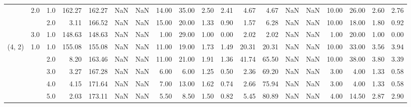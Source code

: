 \begin{tabular}{lllrrrrrrrrrrrrrrrr}
       & 2.0 & 1.0  &    162.27 &     162.27 &               NaN &                NaN & 14.00 &  35.00 &             2.50 &                         2.41 &      4.67 &       4.67 &               NaN &                NaN & 10.00 &  26.00 &             2.60 &                         2.76 \\
       &     & 2.0  &      3.11 &     166.52 &               NaN &                NaN & 15.00 &  20.00 &             1.33 &                         0.90 &      1.57 &       6.28 &               NaN &                NaN & 10.00 &  18.00 &             1.80 &                         0.92 \\
       & 3.0 & 1.0  &    148.63 &     148.63 &               NaN &                NaN &  1.00 &  29.00 &             1.00 &                         0.00 &      2.02 &       2.02 &               NaN &                NaN &  1.00 &  20.00 &             1.00 &                         0.00 \\
(4, 2) & 1.0 & 1.0  &    155.08 &     155.08 &               NaN &                NaN & 11.00 &  19.00 &             1.73 &                         1.49 &     20.31 &      20.31 &               NaN &                NaN & 10.00 &  33.00 &             3.56 &                         3.94 \\
       &     & 2.0  &      8.20 &     163.46 &               NaN &                NaN & 11.00 &  21.00 &             1.91 &                         1.36 &     41.74 &      65.50 &               NaN &                NaN & 10.00 &  38.00 &             3.80 &                         3.39 \\
       &     & 3.0  &      3.27 &     167.28 &               NaN &                NaN &  6.00 &   6.00 &             1.25 &                         0.50 &      2.36 &      69.20 &               NaN &                NaN &  3.00 &   4.00 &             1.33 &                         0.58 \\
       &     & 4.0  &      4.15 &     171.64 &               NaN &                NaN &  7.00 &  13.00 &             1.62 &                         0.74 &      2.66 &      75.94 &               NaN &                NaN &  3.00 &   4.00 &             1.33 &                         0.58 \\
       &     & 5.0  &      2.03 &     173.11 &               NaN &                NaN &  5.50 &   8.50 &             1.50 &                         0.82 &      5.45 &      80.89 &               NaN &                NaN &  4.00 &  14.50 &             2.87 &                         2.90 \\

\end{tabular}
